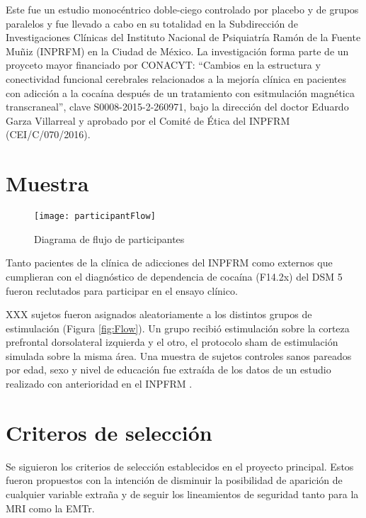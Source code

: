 Este fue un estudio monocéntrico doble-ciego controlado por placebo y de grupos paralelos y fue llevado a cabo en su totalidad en la Subdirección de Investigaciones Clínicas del Instituto Nacional de Psiquiatría Ramón de la Fuente Muñiz (INPRFM) en la Ciudad de México.
La investigación forma parte de un proyceto mayor financiado por CONACYT:
``Cambios en la estructura y conectividad funcional cerebrales relacionados a la mejoría clínica en pacientes con adicción a la cocaína después de un tratamiento con esitmulación magnética transcraneal'',
clave S0008-2015-2-260971, bajo la dirección del doctor Eduardo Garza Villarreal y aprobado por el Comité de Ética del INPFRM (CEI/C/070/2016).

\section{Muestra}
\begin{figure}[h!]
    \centering
    \texttt{[image: participantFlow]}
    \caption{Diagrama de flujo de participantes}
    \label{fig:flow}
\end{figure}

Tanto pacientes de la clínica de adicciones del INPFRM como externos que cumplieran con el diagnóstico de dependencia de cocaína (F14.2x) del DSM 5 \parencite{APA2013} fueron reclutados para participar en el ensayo clínico.\par
XXX sujetos fueron asignados aleatoriamente a los distintos grupos de estimulación (Figura \ref{fig:Flow}).
Un grupo recibió estimulación sobre la corteza prefrontal dorsolateral izquierda y el otro, el protocolo sham de estimulación simulada sobre la misma área.
Una muestra de sujetos controles sanos pareados por edad, sexo y nivel de educación fue extraída de los datos de un estudio realizado con anterioridad en el INPFRM \parencite{Garza2017}.

\section{Criteros de selección}
Se siguieron los criterios de selección establecidos en el proyecto principal.
Estos fueron propuestos con la intención de disminuir la posibilidad de aparición de cualquier variable extraña y de seguir los lineamientos de seguridad tanto para la MRI como la EMTr.

